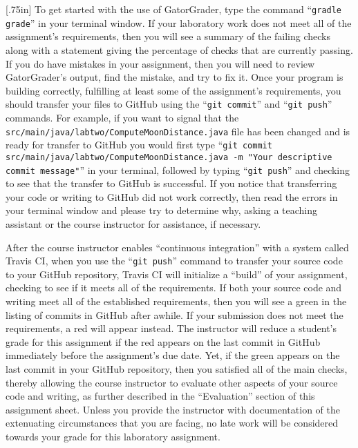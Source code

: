 \documentclass[11pt]{article}
\newcommand{\mainprogramsource}{\lstinline{src/main/java/labtwo/ComputeMoonDistance.java}}
\newcommand{\gatorgraderstart}{\command{gradle grade}}
\newcommand{\gitcommit}{\command{git commit}}
\newcommand{\gitpush}{\command{git push}}
\newcommand{\gitcommitmainprogram}{\command{git commit src/main/java/labtwo/ComputeMoonDistance.java -m "Your
descriptive commit message"}}
\newcommand{\command}[1]{``\lstinline{#1}''}
\newcommand{\step}[1]{``{#1}''}
\newcommand{\checkmark}{\ding{51}}
\newcommand{\naughtmark}{\ding{55}}
\newcommand{\caution}[1]{\null\hfill\LARGE{\faWarning{}}\newline\scriptsize{\em{#1}}}
\begin{document}
\marginnote{\caution{Write useful commits}}[.75in] To get started with the use
of GatorGrader, type the command \gatorgraderstart{} in your terminal window. If
your laboratory work does not meet all of the assignment's requirements, then
you will see a summary of the failing checks along with a statement giving the
percentage of checks that are currently passing. If you do have mistakes in your
assignment, then you will need to review GatorGrader's output, find the mistake,
and try to fix it. Once your program is building correctly, fulfilling at least
some of the assignment's requirements, you should transfer your files to GitHub
using the \gitcommit{} and \gitpush{} commands. For example, if you want to
signal that the \mainprogramsource{} file has been changed and is ready for
transfer to GitHub you would first type \gitcommitmainprogram{} in your
terminal, followed by typing \gitpush{} and checking to see that the transfer to
GitHub is successful. If you notice that transferring your code or writing to
GitHub did not work correctly, then read the errors in your terminal window and
please try to determine why, asking a teaching assistant or the course
instructor for assistance, if necessary.


After the course instructor enables \step{continuous integration} with a system
called Travis CI, when you use the \gitpush{} command to transfer your source
code to your GitHub repository, Travis CI will initialize a \step{build} of your
assignment, checking to see if it meets all of the requirements. If both your
source code and writing meet all of the established requirements, then you will
see a green \checkmark{} in the listing of commits in GitHub after awhile. If
your submission does not meet the requirements, a red \naughtmark{} will appear
instead. The instructor will reduce a student's grade for this assignment if the
red \naughtmark{} appears on the last commit in GitHub immediately before the
assignment's due date. Yet, if the green \checkmark{} appears on the last commit
in your GitHub repository, then you satisfied all of the main checks, thereby
allowing the course instructor to evaluate other aspects of your source code and
writing, as further described in the \step{Evaluation} section of this
assignment sheet. Unless you provide the instructor with documentation of the
extenuating circumstances that you are facing, no late work will be considered
towards your grade for this laboratory assignment.
\end{document}
